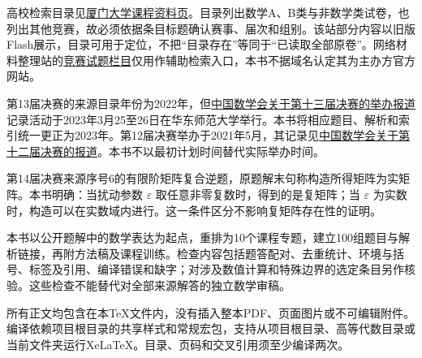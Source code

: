 \documentclass[12pt,fontset=fandol]{ctexart}
\begin{document}
高校检索目录见\href{https://gdjpkc.xmu.edu.cn/DocumentList.aspx?cID=22&dID=383}{厦门大学课程资料页}。目录列出数学A、B类与非数学类试卷，也列出其他竞赛，故必须依据条目标题确认赛事、届次和组别。该站部分内容以旧版Flash展示，目录可用于定位，不把“目录存在”等同于“已读取全部原卷”。网络材料整理站的\href{https://www.cmathc.org.cn/shiti/}{竞赛试题栏目}仅用作辅助检索入口，本书不据域名认定其为主办方官方网站。

第13届决赛的来源目录年份为2022年，但\href{https://www.cms.org.cn/Home/news/news_details/id/1048.html}{中国数学会关于第十三届决赛的举办报道}记录活动于2023年3月25至26日在华东师范大学举行。本书将相应题目、解析和索引统一更正为2023年。第12届决赛举办于2021年5月，其记录见\href{https://www.cms.org.cn/Home/comp/comp_details/id/193.html}{中国数学会关于第十二届决赛的报道}。本书不以最初计划时间替代实际举办时间。

第14届决赛来源序号6的有限阶矩阵复合逆题，原题解末句称构造所得矩阵为实矩阵。本书明确：当扰动参数 $\varepsilon$ 取任意非零复数时，得到的是复矩阵；当 $\varepsilon$ 为实数时，构造可以在实数域内进行。这一条件区分不影响复矩阵存在性的证明。

本书以公开题解中的数学表达为起点，重排为10个课程专题，建立100组题目与解析链接，再附方法稿及课程训练。检查内容包括题答配对、去重统计、环境与括号、标签及引用、编译错误和缺字；对涉及数值计算和特殊边界的选定条目另作核验。这些检查不能替代对全部来源解答的独立数学审稿。

所有正文均包含在本TeX文件内，没有插入整本PDF、页面图片或不可编辑附件。编译依赖项目根目录的共享样式和常规宏包，支持从项目根目录、高等代数目录或当前文件夹运行XeLaTeX。目录、页码和交叉引用须至少编译两次。
\end{document}
